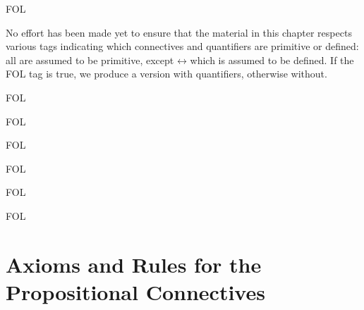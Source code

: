 \documentclass[10pt,a4paper]{article}
\theoremstyle{plain}
\theoremstyle{definition}
\theoremstyle{remark}
\newenvironment{editorial}{}{}
\newcommand*{\olfileid}[3]{}
\newcommand*{\olsection}[1]{\section*{#1}}
\newcommand*{\olchapter}[3]{}
\newcommand*{\olimport}[1]{}
\providecommand{\iftag}[1]{#1}
\providecommand{\liff}{\mathbin{\leftrightarrow}}
\providecommand{\iftag}{}
\begin{document}



\iftag{FOL}
      {\olchapter{fol}{axd}{Axiomatic \usetoken{P}{derivation}}}
      {\olchapter{pl}{axd}{Axiomatic \usetoken{P}{derivation}}}

\begin{editorial}
  No effort has been made yet to ensure that the material in this
  chapter respects various tags indicating which connectives and
  quantifiers are primitive or defined: all are assumed to be
  primitive, except $\liff$ which is assumed to be defined. If the FOL
  tag is true, we produce a version with quantifiers, otherwise
  without.
\end{editorial}

\olimport{rules-and-proofs}

\olimport{axioms-rules-propositional}

\iftag{FOL}{%
  \olimport{axioms-rules-quantifiers}
}{}

\olimport{proving-things}

\iftag{FOL}{%
  \olimport{proving-things-quant}
}{}

\olimport{proof-theoretic-notions}

\olimport{deduction-theorem}

\iftag{FOL}{%
  \olimport{deduction-theorem-quantifiers}
}{}

\olimport{provability-consistency}

\olimport{provability-propositional}

\iftag{FOL}{%
  \olimport{provability-quantifiers}
}{}

\olimport{soundness}

\iftag{FOL}{
  \olimport{identity}
}{}

\OLEndChapterHook





\iftag{FOL}
      {\olfileid{fol}{axd}{prp}}
      {\olfileid{pl}{axd}{prp}}

\olsection{Axioms and Rules for the Propositional Connectives}
\end{document}

